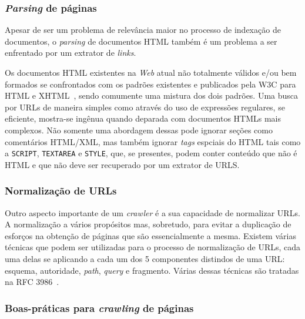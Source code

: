 \documentclass[10pt,twocolumn]{article}
\begin{document}
\subsubsection{\emph{Parsing} de páginas}

Apesar de ser um problema de relevância maior no processo de indexação
de documentos, o \emph{parsing} de documentos HTML também é um problema
a ser enfrentado por um extrator de \emph{links}.

Os documentos HTML existentes na \emph{Web} atual não totalmente válidos
e/ou bem formados se confrontados com os padrões existentes e publicados
pela W3C para HTML e XHTML~\cite{html4tr, bray2006xml}, sendo comumente
uma mistura dos dois padrões. Uma busca por URLs de maneira simples como
através do uso de expressões regulares, se eficiente, mostra-se ingênua
quando deparada com documentos HTMLs mais complexos. Não somente uma
abordagem dessas pode ignorar seções como comentários HTML/XML, mas
também ignorar \emph{tags} espciais do HTML tais como a \texttt{SCRIPT},
\texttt{TEXTAREA} e \texttt{STYLE}, que, se presentes, podem conter
conteúdo que não é HTML e que não deve ser recuperado por um extrator de
URLS.

\subsubsection{Normalização de URLs}

Outro aspecto importante de um \emph{crawler} é a sua capacidade de
normalizar URLs. A normalização a vários propósitos mas, sobretudo, para
evitar a duplicação de esforços na obtenção de páginas que são
essencialmente a mesma. Existem várias técnicas que podem ser utilizadas
para o processo de normalização de URLs, cada uma delas se aplicando a
cada um dos 5 componentes distindos de uma URL: esquema, autoridade,
\emph{path}, \emph{query} e fragmento. Várias dessas técnicas são
tratadas na RFC 3986~\cite{rfc3986}.


\subsubsection{Boas-práticas para \emph{crawling} de páginas}
\end{document}
